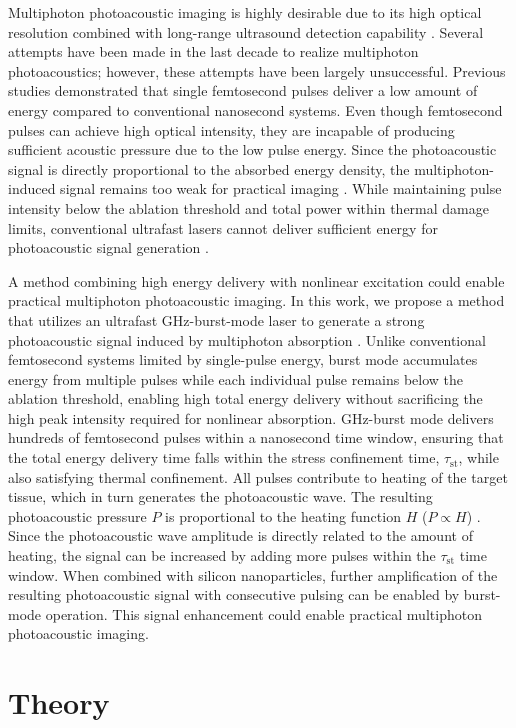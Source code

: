 \documentclass{optica-article}
\begin{document}
Multiphoton photoacoustic imaging is highly desirable due to its high optical resolution combined with long-range ultrasound detection capability \cite{lai2014nonlinear}. Several attempts have been made in the last decade to realize multiphoton photoacoustics; however, these attempts have been largely unsuccessful. Previous studies demonstrated that single femtosecond pulses deliver a low amount of energy compared to conventional nanosecond systems. Even though femtosecond pulses can achieve high optical intensity, they are incapable of producing sufficient acoustic pressure due to the low pulse energy. Since the photoacoustic signal is directly proportional to the absorbed energy density, the multiphoton-induced signal remains too weak for practical imaging \cite{Xu-2006}. While maintaining pulse intensity below the ablation threshold and total power within thermal damage limits, conventional ultrafast lasers cannot deliver sufficient energy for photoacoustic signal generation \cite{boyd-2008}.

A method combining high energy delivery with nonlinear excitation could enable practical multiphoton photoacoustic imaging. In this work, we propose a method that utilizes an ultrafast GHz-burst-mode laser to generate a strong photoacoustic signal induced by multiphoton absorption \cite{kerse2016}. Unlike conventional femtosecond systems limited by single-pulse energy, burst mode accumulates energy from multiple pulses while each individual pulse remains below the ablation threshold, enabling high total energy delivery without sacrificing the high peak intensity required for nonlinear absorption. GHz-burst mode delivers hundreds of femtosecond pulses within a nanosecond time window, ensuring that the total energy delivery time falls within the stress confinement time, $\tau_{\text{st}}$, while also satisfying thermal confinement. All pulses contribute to heating of the target tissue, which in turn generates the photoacoustic wave. The resulting photoacoustic pressure $P$ is proportional to the heating function $H$ ($P \propto H$) \cite{wang-2007}. Since the photoacoustic wave amplitude is directly related to the amount of heating, the signal can be increased by adding more pulses within the $\tau_{\text{st}}$ time window. When combined with silicon nanoparticles, further amplification of the resulting photoacoustic signal with consecutive pulsing can be enabled by burst-mode operation. This signal enhancement could enable practical multiphoton photoacoustic imaging.

\section{Theory}
\end{document}
